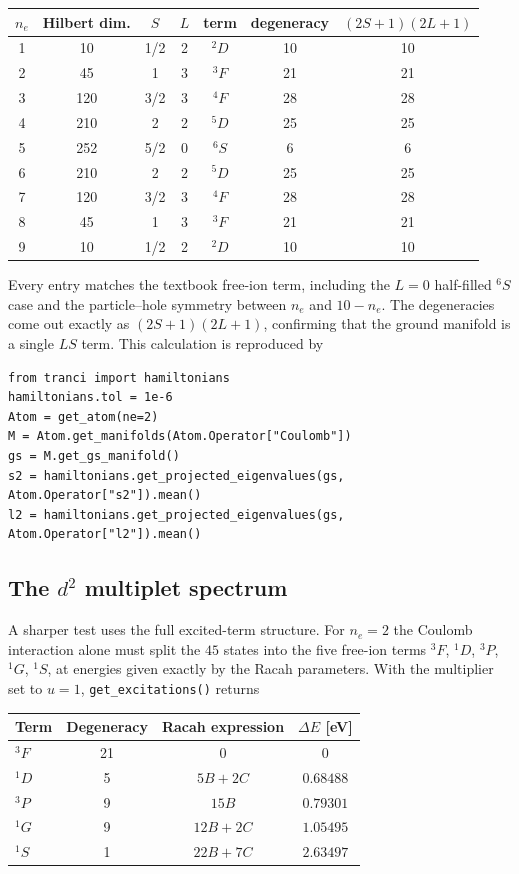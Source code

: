 \documentclass[11pt,a4paper]{article}
\newcommand{\op}[1]{\texttt{#1}}
\begin{document}
\begin{center}
\begin{tabular}{ccccccc}
\toprule
$n_e$ & Hilbert dim. & $S$ & $L$ & term & degeneracy & $(2S{+}1)(2L{+}1)$\\
\midrule
1 & 10  & 1/2 & 2 & $^2D$ & 10 & 10\\
2 & 45  & 1   & 3 & $^3F$ & 21 & 21\\
3 & 120 & 3/2 & 3 & $^4F$ & 28 & 28\\
4 & 210 & 2   & 2 & $^5D$ & 25 & 25\\
5 & 252 & 5/2 & 0 & $^6S$ & 6  & 6\\
6 & 210 & 2   & 2 & $^5D$ & 25 & 25\\
7 & 120 & 3/2 & 3 & $^4F$ & 28 & 28\\
8 & 45  & 1   & 3 & $^3F$ & 21 & 21\\
9 & 10  & 1/2 & 2 & $^2D$ & 10 & 10\\
\bottomrule
\end{tabular}
\end{center}

\noindent
Every entry matches the textbook free-ion term, including the $L=0$ half-filled
$^6S$ case and the particle--hole symmetry between $n_e$ and $10-n_e$.  The
degeneracies come out exactly as $(2S+1)(2L+1)$, confirming that the ground
manifold is a single $LS$ term.  This calculation is reproduced by

\begin{lstlisting}
from tranci import hamiltonians
hamiltonians.tol = 1e-6
Atom = get_atom(ne=2)
M = Atom.get_manifolds(Atom.Operator["Coulomb"])
gs = M.get_gs_manifold()
s2 = hamiltonians.get_projected_eigenvalues(gs, Atom.Operator["s2"]).mean()
l2 = hamiltonians.get_projected_eigenvalues(gs, Atom.Operator["l2"]).mean()
\end{lstlisting}

\subsection{The $d^2$ multiplet spectrum}

A sharper test uses the full excited-term structure.  For $n_e=2$ the Coulomb
interaction alone must split the $45$ states into the five free-ion terms
$^3F$, $^1D$, $^3P$, $^1G$, $^1S$, at energies given exactly by the Racah
parameters.  With the multiplier set to $u=1$, \op{get\_excitations()} returns

\begin{center}
\begin{tabular}{lccc}
\toprule
Term & Degeneracy & Racah expression & $\Delta E$ [eV]\\
\midrule
$^3F$ & 21 & $0$          & $0$\\
$^1D$ & 5  & $5B+2C$      & $0.68488$\\
$^3P$ & 9  & $15B$        & $0.79301$\\
$^1G$ & 9  & $12B+2C$     & $1.05495$\\
$^1S$ & 1  & $22B+7C$     & $2.63497$\\
\bottomrule
\end{tabular}
\end{center}
\end{document}
